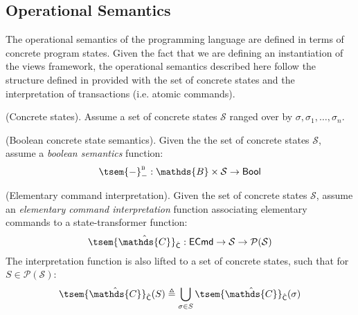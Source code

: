 \subsection{Operational Semantics}
\label{sec:mcapOpSem}
The operational semantics of the programming language are defined in terms of concrete program states. Given the fact that we are defining an instantiation of the views framework, the operational semantics described here follow the structure defined in \cite{views} provided with the set of concrete states and the interpretation of transactions (i.e. atomic commands).

\begin{param}
	(Concrete states).
	Assume a set of concrete states $\mathcal{S}$ ranged over by $\sigma, \sigma_1, \ldots, \sigma_n$.
\end{param}

\begin{param}
	\label{param:boolConcrete}
	(Boolean concrete state semantics).
	Given the the set of concrete states $\mathcal{S}$, assume a \emph{boolean semantics} function:
	\[
		\tsem{-}^\textsc{b}_- : \mathds{B} \times \mathcal{S} \rightarrow \mathsf{Bool}
	\]	
\end{param}

\begin{param}
	\label{param:ecmdInt}
	(Elementary command interpretation).
	Given the set of concrete states $\mathcal{S}$, assume an \emph{elementary command interpretation} function associating elementary commands to a state-transformer function:
	\[
		\tsem{\hat{\mathds{C}}}_{\hat{\mathsf{C}}} : \mathsf{ECmd} \rightarrow \mathcal{S} \rightarrow \mathcal{P}(\mathcal{S})
	\]
	The interpretation function is also lifted to a set of concrete states, such that for $S \in \mathcal{P}(\mathcal{S})$:
	\[
		\tsem{\hat{\mathds{C}}}_{\hat{\mathsf{C}}}(S) \triangleq \bigcup_{\sigma \in S} \tsem{\hat{\mathds{C}}}_{\hat{\mathsf{C}}}(\sigma)
	\]
\end{param}

